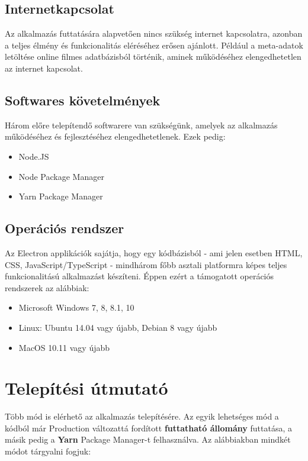 \subsection{Internetkapcsolat}
Az alkalmazás futtatására alapvetően nincs szükség internet kapcsolatra, azonban a teljes élmény és funkcionalitás eléréséhez erősen ajánlott. Például a meta-adatok letöltése online filmes adatbázisból történik, aminek működéséhez elengedhetetlen az internet kapcsolat.

\subsection{Softwares követelmények}
Három előre telepítendő softwarere van szükségünk, amelyek az alkalmazás működéséhez és fejlesztéséhez elengedhetetlenek. Ezek pedig:
\begin{itemize}
	\item Node.JS
	\item Node Package Manager
	\item Yarn Package Manager
\end{itemize}

\subsection{Operációs rendszer}
Az Electron applikációk sajátja, hogy egy kódbázisból - ami jelen esetben HTML, CSS, JavaScript/TypeScript - mindhárom főbb asztali platformra képes teljes funkcionalitású alkalmazást készíteni. Éppen ezért a támogatott operációs rendszerek az alábbiak:
\begin{itemize}
	\item Microsoft Windows 7, 8, 8.1, 10
	\item Linux: Ubuntu 14.04 vagy újabb, Debian 8 vagy újabb
	\item MacOS 10.11 vagy újabb
\end{itemize}

\section{Telepítési útmutató}
Több mód is elérhető az alkalmazás telepítésére. Az egyik lehetséges mód a kódból már Production változattá fordított {\textbf {futtatható állomány}} futtatása, a másik pedig a {\textbf {Yarn}} Package Manager-t felhasználva. Az alábbiakban mindkét módot tárgyalni fogjuk:

